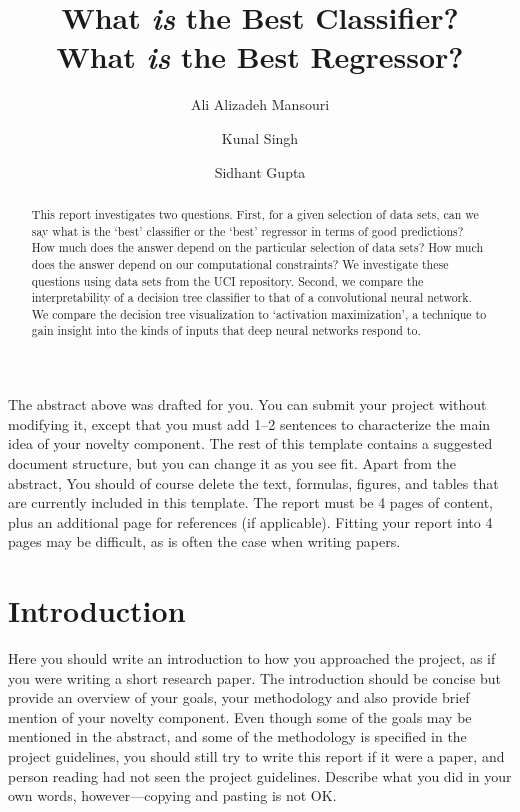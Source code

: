 \documentclass[10pt,twocolumn,letterpaper]{article}
\begin{document}
\title{What {\em is} the Best Classifier?\\
       What {\em is} the Best Regressor?}
\author{Ali Alizadeh Mansouri \and Kunal Singh \and Sidhant Gupta}
\maketitle

\begin{abstract}
   This report investigates two questions.
   First, for a given selection of data sets, can we say what
   is the `best' classifier or the `best' regressor in terms
   of good predictions?
   How much does the answer depend on the particular selection of data sets?
   How much does the answer depend on our computational constraints?
   We investigate these questions using data sets from the UCI repository.
   Second, we compare the interpretability of a decision tree
   classifier to that of a convolutional neural network.
   We compare the decision tree visualization
   to `activation maximization', a technique to gain insight into
   the kinds of inputs that deep neural networks respond to.
\end{abstract}

The abstract above was drafted for you.
You can submit your project without modifying it, except that you must
add 1--2 sentences to characterize the main idea of your novelty component.
The rest of this template contains a suggested document structure,
but you can change it as you see fit.
Apart from the abstract, You should of course delete the text, formulas, figures, and tables that are currently
included in this template.
The report must be 4 pages of content, plus an additional page for references (if applicable).
Fitting your report into 4 pages may be difficult, as is often the case when writing papers.

\section{Introduction}

Here you should write an introduction to how you approached the project,
as if you were writing a short research paper.
The introduction should be concise but provide an overview of your
goals, your methodology and also provide brief mention of your novelty component.
Even though some of the goals may be mentioned in the abstract,
and some of the methodology is specified in the project guidelines,
you should still try to write this report if it were a paper,
and person reading had not seen the project guidelines.
Describe what you did in your own words, however---copying and pasting is not OK.
\end{document}
